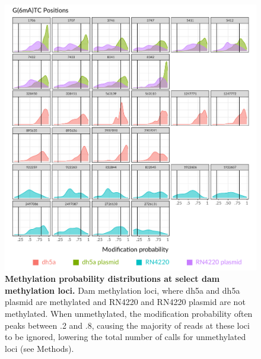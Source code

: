 \begin{figure}[!hb]
\centering
\includegraphics[width = 1\linewidth,keepaspectratio]{figure/modprobsfig.pdf}
\caption[ Methylation probability distributions at select dam methylation loci]{{\bf  Methylation probability distributions at select dam methylation loci.} Dam methylation loci, where dh5a and dh5a plasmid are methylated and RN4220 and RN4220 plasmid are not methylated. When unmethylated, the modification probability often peaks between .2 and .8, causing the majority of reads at these loci to be ignored, lowering the total number of calls for unmethylated loci (see Methods). }
\label{fig:modprobsfig}
\end{figure}



